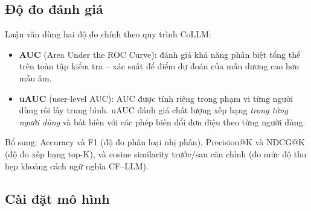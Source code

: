 \subsection{Độ đo đánh giá}
\label{ssec:do-do}

Luận văn dùng hai độ đo chính theo quy trình CoLLM:

\begin{itemize}
    \item \textbf{AUC} (Area Under the ROC Curve): đánh giá khả năng phân biệt tổng thể
    trên toàn tập kiểm tra -- xác suất để điểm dự đoán của mẫu dương cao hơn mẫu âm.

    \item \textbf{uAUC} (user-level AUC): AUC được tính riêng trong phạm vi từng người
    dùng rồi lấy trung bình. uAUC đánh giá chất lượng xếp hạng \textit{trong từng người dùng}
    và bất biến với các phép biến đổi đơn điệu theo từng người dùng.
\end{itemize}

Bổ sung: Accuracy và F1 (độ đo phân loại nhị phân), Precision@K và NDCG@K
(độ đo xếp hạng top-K), và cosine similarity trước/sau căn chỉnh (đo mức độ thu hẹp
khoảng cách ngữ nghĩa CF--LLM).

\subsection{Cài đặt mô hình}
\label{ssec:cai-dat}

